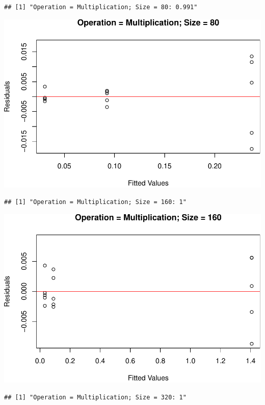 \documentclass[
]{article}
\begin{document}
\begin{verbatim}
## [1] "Operation = Multiplication; Size = 80: 0.991"
\end{verbatim}

\includegraphics{main_files/figure-latex/unnamed-chunk-20-12.pdf}

\begin{verbatim}
## [1] "Operation = Multiplication; Size = 160: 1"
\end{verbatim}

\includegraphics{main_files/figure-latex/unnamed-chunk-20-13.pdf}

\begin{verbatim}
## [1] "Operation = Multiplication; Size = 320: 1"
\end{verbatim}
\end{document}
